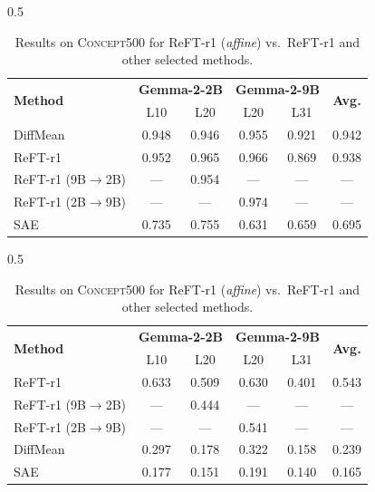 \begin{table}[h!]
\begin{subtable}[b]{0.5\textwidth}
    \small
    \centering
\begin{tabular}{lccccc}
\toprule
\multirow[t]{2}{*}{\textbf{Method}} & \multicolumn{2}{c}{\textbf{Gemma-2-2B}}  & \multicolumn{2}{c}{\textbf{Gemma-2-9B}} & \multirow[t]{2}{*}{\textbf{Avg.}} \\
& \multicolumn{1}{c}{L10} & \multicolumn{1}{c}{L20} & \multicolumn{1}{c}{L20} & \multicolumn{1}{c}{L31} \\
\midrule
DiffMean & 0.948 & 0.946 & 0.955 & 0.921 & 0.942 \\
ReFT-r1 & 0.952 & 0.965 & 0.966 & 0.869 & 0.938 \\
\rowcolor{blue!20}ReFT-r1 (9B$\to$2B) & --- & 0.954 & --- & --- & --- \\
\rowcolor{blue!20}ReFT-r1 (2B$\to$9B) & --- & --- & 0.974 & --- & --- \\
SAE & 0.735 & 0.755 & 0.631 & 0.659 & 0.695 \\
\bottomrule
\end{tabular}
\caption{\concepttag{} Mean AUROC.}
\label{tab:transform-roc-auc}
\end{subtable}
\begin{subtable}[b]{0.5\textwidth}
    \small
    \centering
\begin{tabular}{lccccc}
\toprule
\multirow[t]{2}{*}{\textbf{Method}} & \multicolumn{2}{c}{\textbf{Gemma-2-2B}}  & \multicolumn{2}{c}{\textbf{Gemma-2-9B}} & \multirow[t]{2}{*}{\textbf{Avg.}} \\
& \multicolumn{1}{c}{L10} & \multicolumn{1}{c}{L20} & \multicolumn{1}{c}{L20} & \multicolumn{1}{c}{L31} \\
\midrule
ReFT-r1 & 0.633 & 0.509 & 0.630 & 0.401 & 0.543 \\
\rowcolor{blue!20} ReFT-r1 (9B$\to$2B) & --- & 0.444 & --- & --- & --- \\
\rowcolor{blue!20} ReFT-r1 (2B$\to$9B) & --- & --- & 0.541 & --- & --- \\
DiffMean & 0.297 & 0.178 & 0.322 & 0.158 & 0.239 \\
SAE & 0.177 & 0.151 & 0.191 & 0.140 & 0.165 \\
\bottomrule
\end{tabular}
\caption{\steeringtag{} Overall score.}
\label{tab:transform-steer-judge}
\end{subtable}
    \caption{Results on \textsc{Concept500} for ReFT-r1 (\textit{affine}) vs.~ReFT-r1 and other selected methods.}
    \label{tab:transform}
\end{table}
